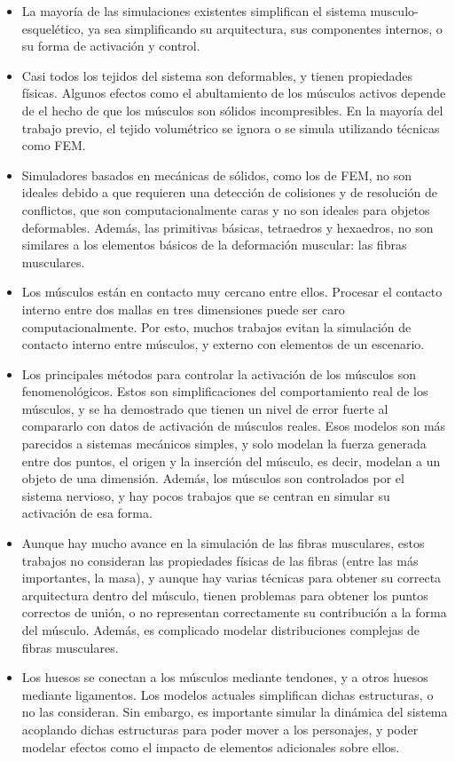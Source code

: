 \begin{itemize}
	\item La mayoría de las simulaciones existentes simplifican el sistema musculo-esquelético, ya sea simplificando su arquitectura, sus componentes internos, o su forma de activación y control.
	\item Casi todos los tejidos del sistema son deformables, y tienen propiedades físicas. Algunos efectos como el abultamiento de los músculos activos depende de el hecho de que los músculos son sólidos incompresibles. En la mayoría del trabajo previo, el tejido volumétrico se ignora o se simula utilizando técnicas como FEM.
	\item Simuladores basados en mecánicas de sólidos, como los de FEM, no son ideales debido a que requieren una detección de colisiones y de resolución de conflictos, que son computacionalmente caras y no son ideales para objetos deformables. Además, las primitivas básicas, tetraedros y hexaedros, no son similares a los elementos básicos de la deformación muscular: las fibras musculares.
	\item Los músculos están en contacto muy cercano entre ellos. Procesar el contacto interno entre dos mallas en tres dimensiones puede ser caro computacionalmente. Por esto, muchos trabajos evitan la simulación de contacto interno entre músculos, y externo con elementos de un escenario. 
	\item Los principales métodos para controlar la activación de los músculos son fenomenológicos. Estos son simplificaciones del comportamiento real de los músculos, y se ha demostrado que tienen un nivel de error fuerte al compararlo con datos de activación de músculos reales. Esos modelos son más parecidos a sistemas mecánicos simples, y solo modelan la fuerza generada entre dos puntos, el origen y la inserción del músculo, es decir, modelan a un objeto de una dimensión. Además, los músculos son controlados por el sistema nervioso, y hay pocos trabajos que se centran en simular su activación de esa forma.
	\item Aunque hay mucho avance en la simulación de las fibras musculares, estos trabajos no consideran las propiedades físicas de las fibras (entre las más importantes, la masa), y aunque hay varias técnicas para obtener su correcta arquitectura dentro del músculo, tienen problemas para obtener los puntos correctos de unión, o no representan correctamente su contribución a la forma del músculo. Además, es complicado modelar distribuciones complejas de fibras musculares.
	\item Los huesos se conectan a los músculos mediante tendones, y a otros huesos mediante ligamentos. Los modelos actuales simplifican dichas estructuras, o no las consideran. Sin embargo, es importante simular la dinámica del sistema acoplando dichas estructuras para poder mover a los personajes, y poder modelar efectos como el impacto de elementos adicionales sobre ellos.
\end{itemize}

